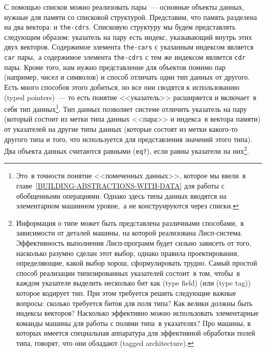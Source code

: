 С помощью списков можно реализовать пары~--- основные
объекты данных, нужные для памяти со списковой структурой.  Представим, что
память разделена на два вектора:   и  
{\tt the-cdrs}.  Списковую структуру мы будем представлять
следующим образом: указатель на пару есть индекс, указывающий внутрь
этих двух векторов. Содержимое элемента {\tt the-cars} с
указанным индексом является {\tt car} пары,~а содержимое
элемента {\tt the-cdrs} с тем же индексом является
{\tt cdr} пары.  Кроме того, нам нужно представление для
объектов помимо пар (например, чисел и символов) и способ отличать
один тип данных от другого.  Есть много способов этого добиться, но
все они сводятся к использованию  
%
 (typed pointers)~--- то есть понятие <<указатель>>
расширяется и включает~в себя тип данных\footnote{Это~в точности понятие   <<помеченных данных>>, которое
мы ввели~в главе~\ref{BUILDING-ABSTRACTIONS-WITH-DATA} для
работы с обобщенными операциями.  Однако здесь типы данных вводятся на
элементарном машинном уровне,~а не конструируются через списки.
}.
Тип данных позволяет системе отличить указатель на пару (который
состоит из метки типа данных <<пара>> и индекса~в вектора памяти) от
указателей на другие типы данных (которые состоят из метки какого-то
другого типа и того, что используется для представления значений этого
типа).  Два объекта данных считаются равными ({\tt eq?}), если
равны указатели на них\footnote{Информация о типе может быть представлена различными
способами,~в зависимости от деталей машины, на которой реализована
Лисп-система.  Эффективность выполнения Лисп-программ будет сильно
зависеть от того, насколько разумно сделан этот выбор, однако
правила проектирования, определяющие, какой выбор хорош,
сформулировать трудно.  Самый простой способ реализации типизированных
указателей состоит~в том, чтобы~в каждом указателе выделить несколько
бит как  (type field) (или 
 (type tag)) которое кодирует
тип. При этом требуется решить следующие важные вопросы: сколько
требуется битов для поля типа?  Как велики должны быть индексы
векторов?  Насколько эффективно можно использовать элементарные
команды машины для работы с полями типа~в указателях?  Про машины, в
которых имеется специальная аппаратура для эффективной обработки полей
типа, говорят, что они обладают  (tagged architecture).
}.
